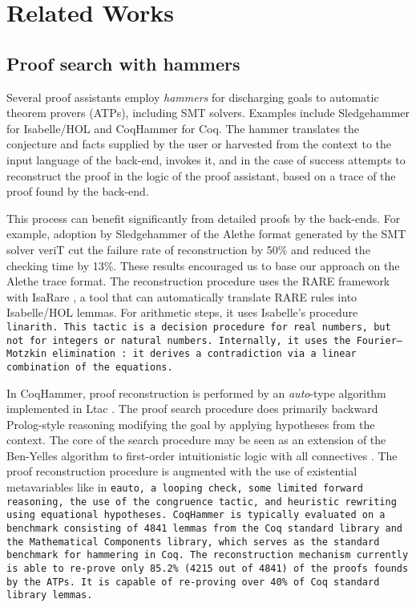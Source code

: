 \chapter{Related Works}\label{ch:relatedworks}

\section{Proof search with hammers}

Several proof assistants employ \emph{hammers} for discharging goals to automatic theorem provers (ATPs), including SMT solvers. Examples include Sledgehammer \cite{Sledgehammer} for Isabelle/HOL and CoqHammer \cite{coqhammer1,coqhammer2} for Coq.
The hammer translates the conjecture and facts supplied by the user or harvested
from the context to the input language of the back-end, invokes it, and in the
case of success attempts to reconstruct the proof in the logic of the proof
assistant, based on a trace of the proof found by the back-end.

This process can benefit significantly from detailed proofs by the back-ends.
For example, adoption by Sledgehammer of the Alethe format generated by the SMT solver veriT \cite{isabelle1,isabelle2} cut the failure rate of reconstruction by 50\% and reduced the checking time by 13\%.
These results encouraged us to base our approach on the Alethe trace format.
The reconstruction procedure uses the RARE framework with IsaRare \cite{IsaRare}, a tool that can automatically translate RARE rules into Isabelle/HOL lemmas.
For arithmetic steps, it uses Isabelle's procedure \tt{linarith}. This tactic is a decision procedure for real numbers, but not for integers or natural numbers.
Internally, it uses the Fourier–Motzkin elimination \cite{linear-arith-book}: it derives a contradiction via a linear combination of the equations.

In CoqHammer, proof reconstruction is performed by an \emph{auto}-type algorithm implemented in Ltac \cite{ltac}. The proof search procedure does primarily backward Prolog-style reasoning modifying the goal by applying hypotheses from the context.
The core of the search procedure may be seen as an extension of the Ben-Yelles algorithm to first-order intuitionistic logic with all connectives \cite{urzyczyn_intuitionistic_2016}.
The proof reconstruction procedure is augmented with  the use of existential metavariables like in \tt{eauto}, a looping check, some limited forward reasoning, the use of the \tt{congruence tactic}, and heuristic
rewriting using equational hypotheses.
CoqHammer is typically evaluated on a benchmark consisting of 4841 lemmas from the Coq standard library and the Mathematical Components library, which serves as the standard benchmark for hammering in Coq.
The reconstruction mechanism currently is able to re-prove only 85.2\% (4215 out of 4841) of the proofs founds by the ATPs.
It is capable of re-proving over 40\% of Coq standard library lemmas.

